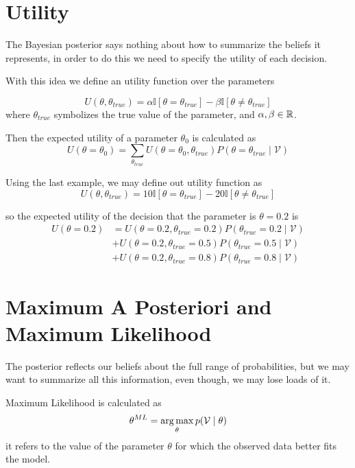 \section{Utility}

The Bayesian posterior says nothing about how to summarize the beliefs it
represents, in order to do this we need to specify the utility of each decision.

With this idea we define an utility function over the parameters

\[
  U(\theta, \theta_{true}) = \alpha \mathbb{I}[\theta = \theta_{true}] - \beta
  \mathbb{I}[\theta \neq \theta_{true}]
\]
where \(\theta_{true}\) symbolizes the true value of the parameter, and \(\alpha, \beta \in
\mathbb{R}\).

Then the expected utility of a parameter \(\theta_0\) is calculated as
\[
  U(\theta = \theta_0) = \sum_{\theta_{true}}U(\theta = \theta_0,
  \theta_{true})P(\theta = \theta_{true}  \mid  \mathcal{V})
\]

Using the last example, we may define out utility function as
\[
  U(\theta, \theta_{true}) = 10 \mathbb{I}[\theta = \theta_{true}] - 20
  \mathbb{I}[\theta \neq \theta_{true}]
\]

so the expected utility of the decision that the parameter is \(\theta = 0.2\)
is
\[
  \begin{aligned}
  U(\theta = 0.2) &= U(\theta = 0.2, \theta_{true} = 0.2)P(\theta_{true} = 0.2  \mid
  \mathcal{V})\\
  &+ U(\theta = 0.2, \theta_{true} = 0.5)P(\theta_{true} = 0.5  \mid
  \mathcal{V}) \\
  & +  U(\theta = 0.2, \theta_{true} = 0.8)P(\theta_{true} = 0.8  \mid  \mathcal{V})
\end{aligned}
\]


\section{Maximum A Posteriori and Maximum Likelihood}

The posterior reflects our beliefs about the full range of probabilities, but we
may want to summarize all this information, even though, we may lose loads of it.

\begin{definition}
  Maximum Likelihood is calculated as
  \[
    \theta^{ML} = \operatorname*{arg\,max}_\theta p(\mathcal{V} \mid \theta)
  \]
   it refers to the value of the parameter
\(\theta\) for which the observed data better fits the model.
\end{definition}

